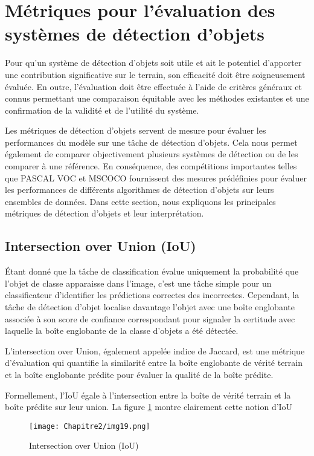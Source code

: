 \section{Métriques pour l'évaluation des systèmes de détection d'objets} 
Pour qu'un système de détection d'objets soit utile et ait le potentiel d'apporter une contribution significative sur le terrain, son efficacité doit être soigneusement évaluée. En outre, l'évaluation doit être effectuée à l'aide de critères généraux et connus permettant une comparaison équitable avec les méthodes existantes et une confirmation de la validité et de l'utilité du système.

Les métriques de détection d'objets servent de mesure pour évaluer les performances du modèle sur une tâche de détection d'objets. Cela nous permet également de comparer objectivement plusieurs systèmes de détection ou de les comparer à une référence. En conséquence, des compétitions importantes telles que PASCAL VOC et MSCOCO fournissent des mesures prédéfinies pour évaluer les performances de différents algorithmes de détection d'objets sur leurs ensembles de données. Dans cette section, nous expliquons les principales métriques de détection d'objets et leur interprétation.
\subsection{Intersection over Union (IoU)}
Étant donné que la tâche de classification évalue uniquement la probabilité que l'objet de classe apparaisse dans l'image, c'est une tâche simple pour un classificateur d'identifier les prédictions correctes des incorrectes. Cependant, la tâche de détection d'objet localise davantage l'objet avec une boîte englobante associée à son score de confiance correspondant pour signaler la certitude avec laquelle la boîte englobante de la classe d'objets a été détectée.

L'intersection over Union, également appelée indice de Jaccard, est une métrique d'évaluation qui quantifie la similarité entre la boîte englobante de vérité terrain  et la boîte englobante prédite pour évaluer la qualité de la boîte prédite. 

Formellement, l'IoU égale à l'intersection entre la boîte de vérité terrain et la boîte prédite sur leur union. La figure \ref{img19} montre clairement cette notion d'IoU
          \begin{figure}[H]
               \centering
               \texttt{[image: Chapitre2/img19.png]}
               \caption{Intersection over Union (IoU)}
               \label{img19}
               \end{figure}

